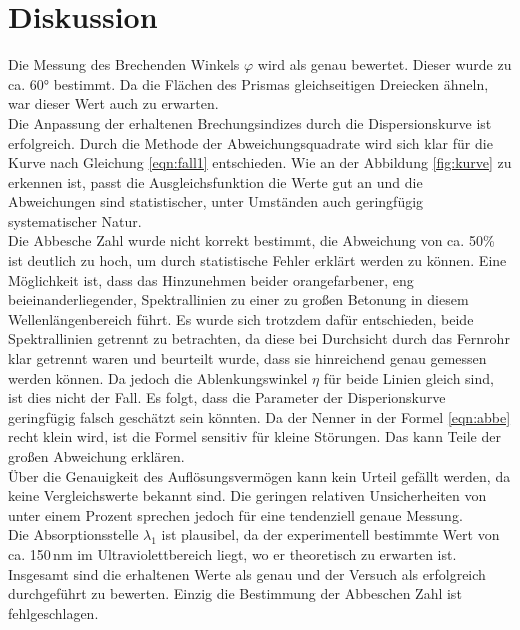 \section{Diskussion}
\label{sec:Diskussion}
Die Messung des Brechenden Winkels $\varphi$ wird als genau bewertet. Dieser wurde
zu ca. 60° bestimmt. Da die Flächen des Prismas gleichseitigen Dreiecken
ähneln, war dieser Wert auch zu erwarten.\\
Die Anpassung der erhaltenen Brechungsindizes durch die Dispersionskurve ist erfolgreich.
Durch die Methode der Abweichungsquadrate wird sich klar für die Kurve nach
Gleichung \eqref{eqn:fall1} entschieden. Wie an der Abbildung \ref{fig:kurve} zu
erkennen ist, passt die Ausgleichsfunktion die Werte gut an und die Abweichungen
sind statistischer, unter Umständen auch geringfügig systematischer Natur.\\
Die Abbesche Zahl wurde nicht korrekt bestimmt, die Abweichung von ca. 50\% ist deutlich
zu hoch, um durch statistische Fehler erklärt werden zu können. Eine Möglichkeit ist,
dass das Hinzunehmen beider orangefarbener, eng beieinanderliegender, Spektrallinien
zu einer zu großen Betonung in diesem Wellenlängenbereich führt. Es wurde sich trotzdem
dafür entschieden, beide Spektrallinien getrennt zu betrachten, da diese bei Durchsicht
durch das Fernrohr klar getrennt waren und beurteilt wurde, dass sie hinreichend genau gemessen werden können.
Da jedoch die Ablenkungswinkel $\eta$ für beide Linien gleich sind, ist dies nicht der Fall.
Es folgt, dass die Parameter der Disperionskurve geringfügig falsch geschätzt sein könnten.
Da der Nenner in der Formel \eqref{eqn:abbe} recht klein wird, ist die Formel
sensitiv für kleine Störungen. Das kann Teile der großen Abweichung erklären.\\
Über die Genauigkeit des Auflösungsvermögen kann kein Urteil gefällt werden, da keine
Vergleichswerte bekannt sind. Die geringen relativen Unsicherheiten von unter einem Prozent
sprechen jedoch für eine tendenziell genaue Messung.\\
Die Absorptionsstelle $\lambda_1$ ist plausibel, da der experimentell bestimmte Wert von ca. 150\,nm im
Ultraviolettbereich liegt, wo er theoretisch zu erwarten ist.\\
Insgesamt sind die erhaltenen Werte als genau und der Versuch als erfolgreich
durchgeführt zu bewerten. Einzig die Bestimmung der Abbeschen Zahl ist fehlgeschlagen.
